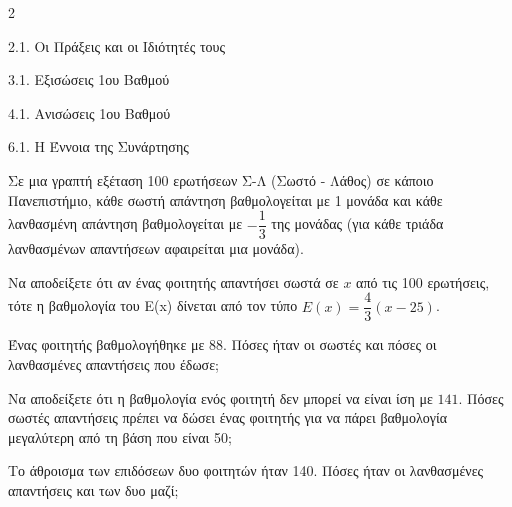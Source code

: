 \begin{ylh}{2}
    \item 2.1. Οι Πράξεις και οι Ιδιότητές τους
    \item 3.1. Εξισώσεις 1ου Βαθμού
    \item 4.1. Ανισώσεις 1ου Βαθμού
    \item 6.1. Η Έννοια της Συνάρτησης
\end{ylh}
Σε μια γραπτή εξέταση 100 ερωτήσεων Σ-Λ (Σωστό - Λάθος) σε κάποιο Πανεπιστήμιο, κάθε σωστή απάντηση βαθμολογείται με 1 μονάδα και κάθε λανθασμένη απάντηση βαθμολογείται με $-\dfrac{1}{3}$ της μονάδας (για κάθε τριάδα λανθασμένων απαντήσεων αφαιρείται μια μονάδα).

\begin{alist}
\item Να αποδείξετε ότι αν ένας φοιτητής απαντήσει σωστά σε $x$ από τις 100 ερωτήσεις, τότε η βαθμολογία του E(x) δίνεται από τον τύπο $E(x) = \dfrac{4}{3}(x-25)$.
\item Ένας φοιτητής βαθμολογήθηκε με 88. Πόσες ήταν οι σωστές και πόσες οι λανθασμένες απαντήσεις που έδωσε;
\item Να αποδείξετε ότι η βαθμολογία ενός φοιτητή δεν μπορεί να είναι ίση με $141$. Πόσες σωστές απαντήσεις πρέπει να δώσει ένας φοιτητής για να πάρει βαθμολογία μεγαλύτερη από τη βάση που είναι 50;
\item Το άθροισμα των επιδόσεων δυο φοιτητών ήταν 140. Πόσες ήταν οι λανθασμένες απαντήσεις και των δυο μαζί;
\end{alist}

